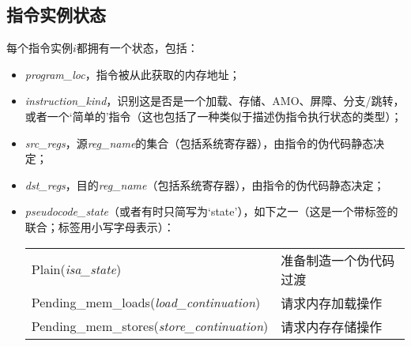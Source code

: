 \subsection{指令实例状态}\label{sec:omm:inst_state}
每个指令实例$i$都拥有一个状态，包括：
\begin{itemize}
\item {\it program\_loc}，指令被从此获取的内存地址； %
\item {\it instruction\_kind}，识别这是否是一个加载、存储、AMO、屏障、分支/跳转，或者一个‘简单的’指令（这也包括了一种类似于描述伪指令执行状态的类型）； %
\item {\it src\_regs}，源{\it reg\_name}的集合（包括系统寄存器），由指令的伪代码静态决定； %
\item {\it dst\_regs}，目的{\it reg\_name}（包括系统寄存器），由指令的伪代码静态决定； %
\item {\it pseudocode\_state}（或者有时只简写为‘state’），如下之一（这是一个带标签的联合；标签用小写字母表示）：  %
  \begin{center}
  \begin{tabular}{l@{ \quad-\quad }l}
  {\sc Plain}({\it isa\_state})
    & 准备制造一个伪代码过渡 \\
  {\sc Pending\_mem\_loads}({\it load\_continuation})
    & 请求内存加载操作 \\
  {\sc Pending\_mem\_stores}({\it store\_continuation})
    & 请求内存存储操作 \\
  \end{tabular}
  \end{center}


\end{itemize}
